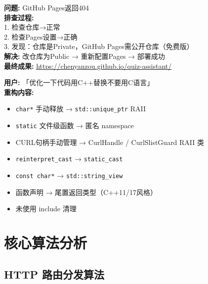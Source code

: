 \documentclass[12pt,a4paper]{ctexart}
\begin{document}
\begin{dialogbox}[title=对话6: 公网部署问题排查]
\textbf{问题:} GitHub Pages返回404\\
\textbf{排查过程:}\\
1. 检查仓库→正常\\
2. 检查Pages设置→正确\\
3. 发现：仓库是Private，GitHub Pages需公开仓库（免费版）\\
\textbf{解决:} 改仓库为Public → 重新配置Pages → 部署成功\\[4pt]
\textbf{最终成果:} \url{https://chenyanzou.github.io/quiz-assistant/}
\end{dialogbox}

\vspace{6pt}

\begin{dialogbox}[title=对话7: C++现代化重构]
\textbf{用户:} 「优化一下代码用C++替换不要用C语言」\\
\textbf{重构内容:}
\begin{itemize}[nosep]
    \item \texttt{char*} 手动释放 → \texttt{std::unique\_ptr} RAII
    \item \texttt{static} 文件级函数 → 匿名 namespace
    \item CURL句柄手动管理 → CurlHandle / CurlSlistGuard RAII 类
    \item \texttt{reinterpret\_cast} → \texttt{static\_cast}
    \item \texttt{const char*} → \texttt{std::string\_view}
    \item 函数声明 → 尾置返回类型（C++11/17风格）
    \item 未使用 include 清理
\end{itemize}
\end{dialogbox}

\newpage

\section{核心算法分析}

\subsection{HTTP 路由分发算法}
\end{document}
